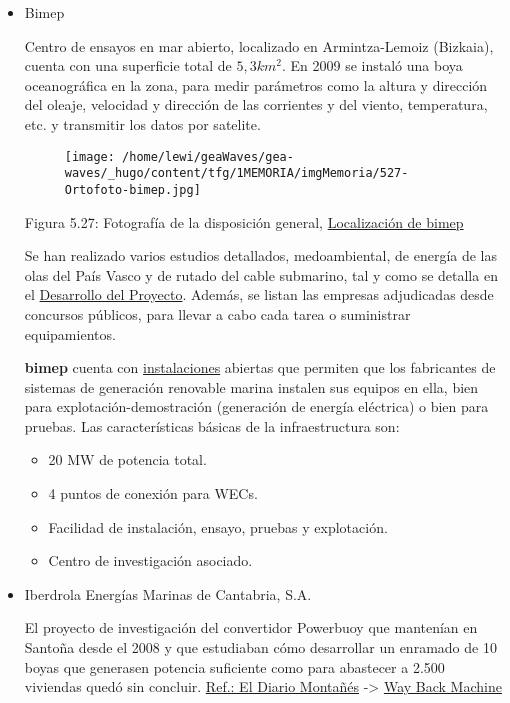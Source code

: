 \begin{itemize}
\item
  Bimep

  Centro de ensayos en mar abierto, localizado en Armintza-Lemoiz
  (Bizkaia), cuenta con una superficie total de \(5,3 km^2\). En 2009 se
  instaló una boya oceanográfica en la zona, para medir parámetros como
  la altura y dirección del oleaje, velocidad y dirección de las
  corrientes y del viento, temperatura, etc. y transmitir los datos por
  satelite.

  \begin{figure}
  \centering
  \texttt{[image: /home/lewi/geaWaves/gea-waves/\_hugo/content/tfg/1MEMORIA/imgMemoria/527-Ortofoto-bimep.jpg]}
  \caption{}
  \end{figure}

  Figura 5.27: Fotografía de la disposición general,
  \href{http://bimep.com/sobre-bimep/localizacion-de-bimep/}{Localización
  de bimep}

  Se han realizado varios estudios detallados, medoambiental, de energía
  de las olas del País Vasco y de rutado del cable submarino, tal y como
  se detalla en el
  \href{http://bimep.com/sobre-bimep/desarrollo-del-proyecto/}{Desarrollo
  del Proyecto}. Además, se listan las empresas adjudicadas desde
  concursos públicos, para llevar a cabo cada tarea o suministrar
  equipamientos.

  \textbf{bimep} cuenta con
  \href{http://bimep.com/sobre-bimep/instalaciones/}{instalaciones}
  abiertas que permiten que los fabricantes de sistemas de generación
  renovable marina instalen sus equipos en ella, bien para
  explotación-demostración (generación de energía eléctrica) o bien para
  pruebas. Las características básicas de la infraestructura son:

  \begin{itemize}
  \item
    20 MW de potencia total.
  \item
    4 puntos de conexión para WECs.
  \item
    Facilidad de instalación, ensayo, pruebas y explotación.
  \item
    Centro de investigación asociado.
  \end{itemize}
\item
  Iberdrola Energías Marinas de Cantabria, S.A.

  El proyecto de investigación del convertidor Powerbuoy que mantenían
  en Santoña desde el 2008 y que estudiaban cómo desarrollar un enramado
  de 10 boyas que generasen potencia suficiente como para abastecer a
  2.500 viviendas quedó sin concluir.
  \href{http://www.eldiariomontanes.es/20131116/local/castro-oriental/abandono-proyecto-iberdrola-santona-201311161639.html}{Ref.:
  El Diario Montañés} -\textgreater{}
  \href{https://web.archive.org/web/20170904012830/http://www.eldiariomontanes.es/20131116/local/castro-oriental/abandono-proyecto-iberdrola-santona-201311161639.html}{Way
  Back Machine}


\end{itemize}
